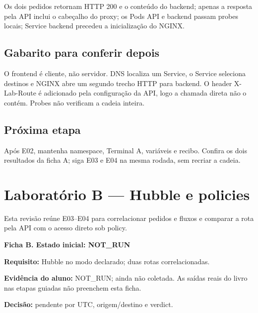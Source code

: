 \documentclass[12pt,openany,oneside,a4paper,chapter=TITLE,english,brazil]{abntex2}
\begin{document}
Os dois pedidos retornam HTTP 200 e o conteúdo do backend; apenas a resposta pela API inclui o cabeçalho do proxy; os Pods API e backend passam probes locais; Service backend precedeu a inicialização do NGINX.

\section*{Gabarito para conferir depois}\label{gabarito-para-conferir-depois-1}

O frontend é cliente, não servidor. DNS localiza um Service, o Service seleciona destinos e NGINX abre um segundo trecho HTTP para backend. O header X-Lab-Route é adicionado pela configuração da API, logo a chamada direta não o contém. Probes não verificam a cadeia inteira.

\section*{Próxima etapa}\label{pruxf3xima-etapa}

Após E02, mantenha namespace, Terminal A, variáveis e recibo. Confira os dois
resultados da ficha A; siga E03 e E04 na mesma rodada, sem recriar a cadeia.

\chapter*{Laboratório B — Hubble e policies}

Esta revisão reúne E03--E04 para correlacionar pedidos e fluxos e comparar a rota pela API com o acesso direto sob policy.

\begin{mdframed}[linewidth=0.6pt,innertopmargin=6pt,innerbottommargin=6pt]
\small
\textbf{Ficha B. Estado inicial: NOT\_RUN}

\textbf{Requisito:} Hubble no modo declarado; duas rotas
correlacionadas.

\textbf{Evidência do aluno:} NOT\_RUN; ainda não coletada. As saídas
reais do livro nas etapas guiadas não preenchem esta ficha.

\textbf{Decisão:} pendente por UTC, origem/destino e verdict.
\end{mdframed}
\end{document}
